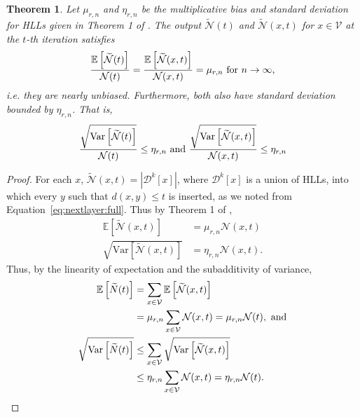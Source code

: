 \documentclass{vldb}
\newcommand{\algoname}[1]{\textnormal{\textsc{#1}}}
\newcommand{\E}{\mathbb{E}}
\newcommand{\Var}{\mathrm{Var}}
\begin{document}
\newtheorem{theorem}{Theorem}
\begin{theorem} \label{thm:nbhd}
Let $\mu_{r, n}$ and $\eta_{r, n}$ be the multiplicative bias and standard deviation for \algoname{HLL}s given in Theorem 1 of \cite{flajolet2007hyperloglog}.
The output $\widetilde{\mathcal{N}}(t)$ and $\widetilde{\mathcal{N}}(x, t)$ for $x \in \mathcal{V}$ at the $t$-th iteration satisfies 
%
\begin{equation*}
	\frac{\E \left [ \widetilde{\mathcal{N}}(t) \right ]}{\mathcal{N}(t)} 
	= \frac{\E \left [ \widetilde{\mathcal{N}}(x, t) \right ]}{\mathcal{N}(x, t)} 
	= \mu_{r, n} 
	\textnormal{ for $n \rightarrow \infty$,}
\end{equation*}
%
i.e. they are nearly unbiased.
%
Furthermore, both also have standard deviation bounded by $\eta_{r,n}$.
That is, 
%
\begin{equation*}
	\frac{\sqrt{\Var \left [ \widetilde{\mathcal{N}}(t)\right ]}}{\mathcal{N}(t)} \leq \eta_{r, n}
	\textnormal{ and }
	\frac{\sqrt{\Var \left [ \widetilde{\mathcal{N}}(x, t) \right ]}}{\mathcal{N}(x, t)} \leq \eta_{r, n}
\end{equation*}
\end{theorem}

\begin{proof}
For each $x$, $\widetilde{\mathcal{N}}(x, t) = |\mathcal{D}^k[x]|$, where $\mathcal{D}^k[x]$ is a union of \algoname{HLL}s, into which every $y$ such that $d(x,y) \leq t$ is inserted, as we noted from Equation~\eqref{eq:nextlayer:full}. 
Thus by Theorem 1 of \cite{flajolet2007hyperloglog}, 
%
\begin{align*}
\E \left [ \widetilde{\mathcal{N}}(x, t) \right ] 
&= \mu_{r,n} \mathcal{N}(x, t) \\
\sqrt{\Var \left [ \widetilde{\mathcal{N}}(x, t) \right ]} 
&= \eta_{r,n} \mathcal{N}(x, t).
\end{align*}
%
Thus, by the linearity of expectation and the subadditivity of variance, 
\begin{align*}
\E \left [ \widetilde{N}(t) \right ] 
&= \sum_{x \in \mathcal{V}} \E \left [ \widetilde{\mathcal{N}}(x, t) \right ]  \\
&= \mu_{r, n} \sum_{x \in \mathcal{V}} \mathcal{N}(x, t)  
= \mu_{r,n} \mathcal{N}(t),
\textnormal{ and} \\
%
%
\sqrt{\Var \left [ \widetilde{N}(t) \right ]} 
&\leq \sum_{x \in \mathcal{V}} \sqrt{\Var \left [ \widetilde{\mathcal{N}}(x, t) \right ]}  \\
&\leq \eta_{r, n} \sum_{x \in \mathcal{V}} \mathcal{N}(x, t)  
= \eta_{r, n} \mathcal{N}(t).
\end{align*}
%
\end{proof}
\end{document}
